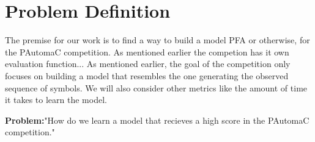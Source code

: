 \section{Problem Definition}

The premise for our work is to find a way to build a model PFA or otherwise, for the PAutomaC competition.
As mentioned earlier the competion has it own evaluation function... 
As mentioned earlier, the goal of the competition only focuses on building a model that resembles the one generating the
observed sequence of symbols.
We will also consider other metrics like the amount of time it takes to learn the model.

\textbf{Problem:}"How do we learn a model that recieves a high score in the PAutomaC competition."








